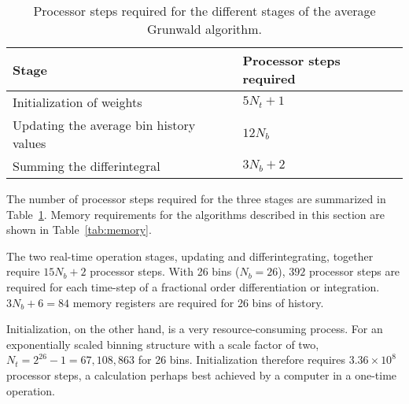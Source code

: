 \begin{table}
\begin{tabular}{ll}
\hline
Stage &Processor steps required \\
\hline
Initialization of weights &$5N_t+1$ \\
Updating the average bin history values &$12N_b$ \\
Summing the differintegral &$3N_b+2$\\
\hline
\end{tabular}
\caption{Processor steps required for the different stages of the average Grunwald algorithm.}
\label{tab:processor}
\end{table}

\smallskip

The number of processor steps required for the three stages are
summarized in Table~\ref{tab:processor}. Memory requirements for the
algorithms described in this section are shown in
Table~\ref{tab:memory}. 

The two real-time operation stages, updating and differintegrating,
together require $15N_b+2$ processor steps. With 26 bins ($N_b=26$),
$392$ processor steps are required for each time-step of a fractional
order differentiation or integration. $3N_b+6=84$ memory registers are
required for 26 bins of history.

Initialization, on the other hand, is a very resource-consuming
process. For an exponentially scaled binning structure with a scale
factor of two, $N_t=2^{26}-1=67,108,863$ for 26 bins. Initialization
therefore requires $3.36\times 10^8$ processor steps, a calculation
perhaps best achieved by a computer in a one-time operation. 



